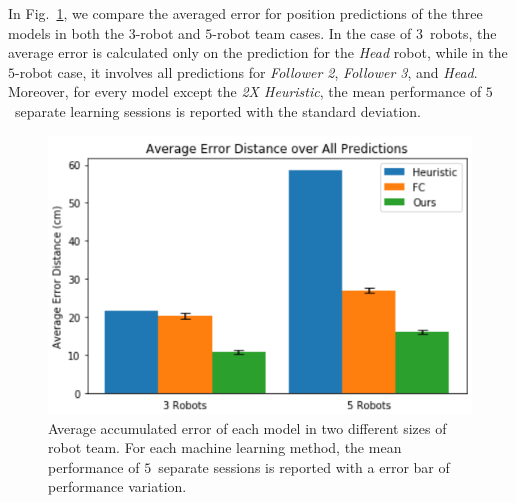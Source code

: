 \documentclass[letterpaper, 10 pt, conference]{ieeeconf}  %
\begin{document}
    In Fig.~\ref{fig:macro_eval}, we compare the averaged error for
    position predictions of the three models in both the $3$-robot and
    $5$-robot team cases. In the case of $3$~robots, the average error
    is calculated only on the prediction for the \emph{Head} robot,
    while in the $5$-robot case, it involves all predictions for
    \emph{Follower 2}, \emph{Follower 3}, and \emph{Head}. Moreover, for
    every model except the \emph{2X Heuristic}, the mean performance of
    $5$~separate learning sessions is reported with the standard
    deviation.
	\begin{figure}[t]
        \centering
        \includegraphics[width=1.\columnwidth]{fig_macro_eval}
        \caption{Average accumulated error of each model in two different sizes of robot team.
            For each machine learning method, the mean performance of $5$~separate sessions is reported with a error bar of performance variation.
        }
        \label{fig:macro_eval}
	\end{figure}
\end{document}

